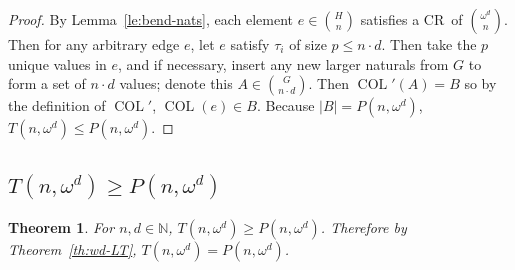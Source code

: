 \documentclass[11pt]{article}
\newcommand{\om}{\omega}
\newcommand{\COL}{\operatorname{COL}}
\newcommand{\N}{\mathbb{N}}
\newcommand{\crulenospace}{CR}
\newcommand{\crule}{\crulenospace~}
\newcommand{\numpoints}{n}
\newcommand{\Commonconst}{A}
\newcommand{\Rareconst}{B}
\theoremstyle{plain}
\newtheorem{theorem}{Theorem}[section]
\theoremstyle{definition}
\begin{document}
\begin{proof}
By Lemma~\ref{le:bend-nats}, each element $e \in \binom{H}{\numpoints}$ satisfies a \crule of $\binom{\om^d}{\numpoints}$. 
Then for any arbitrary edge $e$, let $e$ satisfy $\tau_i$ of size $p \leq \numpoints \cdot d$. 
Then take the $p$ unique values in $e$, and if necessary, insert any new larger naturals from 
$G$ to form a set of $\numpoints \cdot d$ values; denote this $\Commonconst \in \binom{G}{\numpoints \cdot d}$.
Then
$\COL'(\Commonconst) = \Rareconst$ so by the definition of $\COL'$, $\COL(e) \in \Rareconst$. 
Because $|\Rareconst| = P(\numpoints,\om^d)$, $T(\numpoints,\om^d) \leq P(\numpoints,\om^d)$.
\end{proof}

\subsection{\texorpdfstring{$T(\numpoints,\omega^d) \geq P(\numpoints, \om^d)$}{T(\numpoints, omega d) >= P(\numpoints, omega d)}}


\begin{theorem}\label{th:wd-GT}
For $\numpoints,d \in \N$, $T\left(\numpoints,\om^d\right) \geq P\left(\numpoints,\om^d\right)$. Therefore by Theorem~\ref{th:wd-LT}, $T(\numpoints,\om^d) =  P(\numpoints,\om^d)$.
\end{theorem} 
\end{document}
